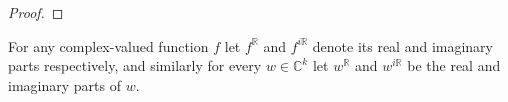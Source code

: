 \documentclass[
	fontsize=11pt, 
	twoside=false, 
	abstract=true, 
	a4paper,
]{scrartcl}
\newcommand{\RR}{\mathbb{R}}
\newcommand{\CC}{\mathbb{C}}
\newcommand{\abs}[1]{\left\lvert#1\right\rvert}
\newcommand{\del}{\partial}
\begin{document}
\begin{proof}
%
\end{proof}

For any complex-valued function $f$ let $f^{\RR}$ and $f^{i\RR}$ denote its real and imaginary parts respectively, and similarly for every $w \in \CC^k$ let $w^{\RR}$ and $w^{i\RR}$ be the real and imaginary parts of $w$.
\end{document}
